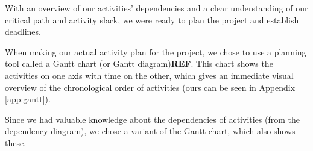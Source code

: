 With an overview of our activities’ dependencies and a clear understanding of our
critical path and activity slack, we were ready to plan the project and establish
deadlines.

When making our actual activity plan for the project, we chose to use a planning
tool called a Gantt chart (or Gantt diagram)\textbf{REF}. This chart shows the
activities on one axis with time on the other, which gives an immediate visual
overview of the chronological order of activities (ours can be seen in Appendix
\ref{app:gantt}).

Since we had valuable knowledge about the dependencies of activities (from the
dependency diagram), we chose a variant of the Gantt chart, which also shows these.